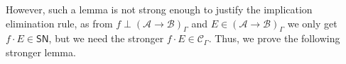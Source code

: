\documentclass[a4paper,USenglish,cleveref, autoref, thm-restate]{lipics-v2019}
\newcommand{\nextcase}{\item~}
\newcommand{\tin}{\ensuremath{\mathsf{in}}}
\newcommand{\inn}[2]{\ensuremath{\tin_{#1}^{#2}}}
\newcommand{\contract}[1][]{\mapsto_{#1}}
\newcommand{\A}{\mathcal{A}}
\newcommand{\B}{\mathcal{B}}
\newcommand{\C}{\mathcal{C}}
\newcommand{\SN}{\mathsf{SN}}
\begin{document}
%
%
However, such a lemma
is not strong enough to justify the implication
elimination rule, as from $f \perp (\A \to \B)_\Gamma$ and $E \in (\A
\to \B)_\Gamma$ we only get $f \cdot E \in \SN$, but we need the
stronger $f \cdot E \in \C_\Gamma$.
Thus, we prove the following stronger lemma.
\end{document}
